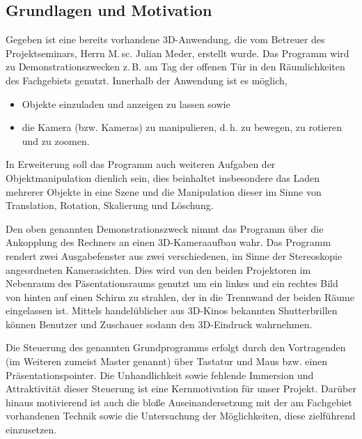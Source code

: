 \subsection{Grundlagen und Motivation}
	Gegeben ist eine bereits vorhandene 3D-Anwendung, die vom Betreuer des Projektseminars, Herrn M.\,sc. Julian Meder, erstellt wurde. Das Programm wird zu Demonstrationszwecken z.\,B. am Tag der offenen Tür in den Räumlichkeiten des Fachgebiets genutzt. Innerhalb der Anwendung ist es möglich,
	\begin{itemize}
		\item Objekte einzuladen und anzeigen zu lassen sowie
		\item die Kamera (bzw. Kameras) zu manipulieren, d.\,h. zu bewegen, zu rotieren und zu zoomen.
	\end{itemize}
	In Erweiterung soll das Programm auch weiteren Aufgaben der Objektmanipulation dienlich sein, dies beinhaltet insbesondere das Laden mehrerer Objekte in eine Szene und die Manipulation dieser im Sinne von Translation, Rotation, Skalierung und Löschung.\par
	Den oben genannten Demonstrationszweck nimmt das Programm über die Ankopplung des Rechners an einen 3D-Kameraaufbau wahr. Das Programm rendert zwei Ausgabefenster aus zwei verschiedenen, im Sinne der Stereoskopie angeordneten Kamerasichten. Dies wird von den beiden Projektoren im Nebenraum des Päsentationsraums genutzt um ein linkes und ein rechtes Bild von hinten auf einen Schirm zu strahlen, der in die Trennwand der beiden Räume eingelassen ist. Mittels handelüblicher aus 3D-Kinos bekannten Shutterbrillen können Benutzer und Zuschauer sodann den 3D-Eindruck wahrnehmen.\par
	Die Steuerung des genannten Grundprogramms erfolgt durch den Vortragenden (im Weiteren zumeist Master genannt) über Tastatur und Maus bzw. einen Präsentationspointer. Die Unhandlichkeit sowie fehlende Immersion und Attraktivität dieser Steuerung ist eine Kernmotivation für unser Projekt. Darüber hinaus motivierend ist auch die bloße Auseinandersetzung mit der am Fachgebiet vorhandenen Technik sowie die Untersuchung der Möglichkeiten, diese zielführend einzusetzen.